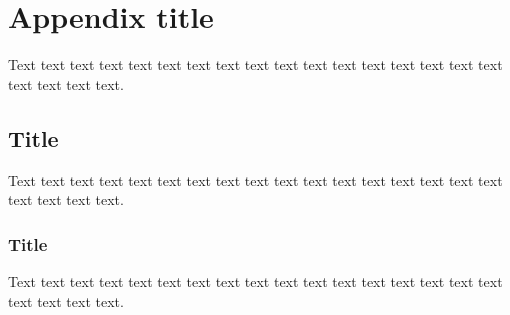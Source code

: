 \documentclass[preprint]{iucr}              %
\begin{document}
\appendix
\section{Appendix title}

Text text text text text text text text text text text text text text
text text text text text text text.

\subsection{Title}

Text text text text text text text text text text text text text text
text text text text text text text.

\subsubsection{Title}

Text text text text text text text text text text text text text text
text text text text text text text.






\cite{knuth84}



\end{document}
